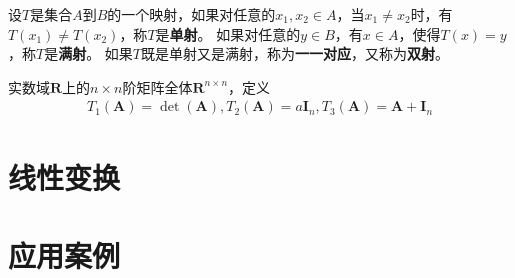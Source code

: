 \begin{definition}
    设$T$是集合$A$到$B$的一个映射，如果对任意的$x_{1},x_{2}\in{A}$，当$x_{1}\neq{x_{2}}$时，有$T(x_{1})\neq{T(x_{2})}$，称$T$是\textbf{单射}。
    如果对任意的$y\in{B}$，有$x\in{A}$，使得$T(x)=y$，称$T$是\textbf{满射}。
    如果$T$既是单射又是满射，称为\textbf{一一对应}，又称为\textbf{双射}。
\end{definition}

\begin{example}
    实数域$\mathbf{R}$上的$n\times{n}$阶矩阵全体$\mathbf{R}^{n\times{n}}$，定义
    \begin{eqnarray}
        T_{1}\left(\mathbf{A}\right)=\det\left(\mathbf{A}\right),T_{2}\left(\mathbf{A}\right)=a\mathbf{I}_{n},T_{3}\left(\mathbf{A}\right)=\mathbf{A}+\mathbf{I}_{n}\nonumber
    \end{eqnarray}
\end{example}
\section{线性变换}
\section{应用案例}
